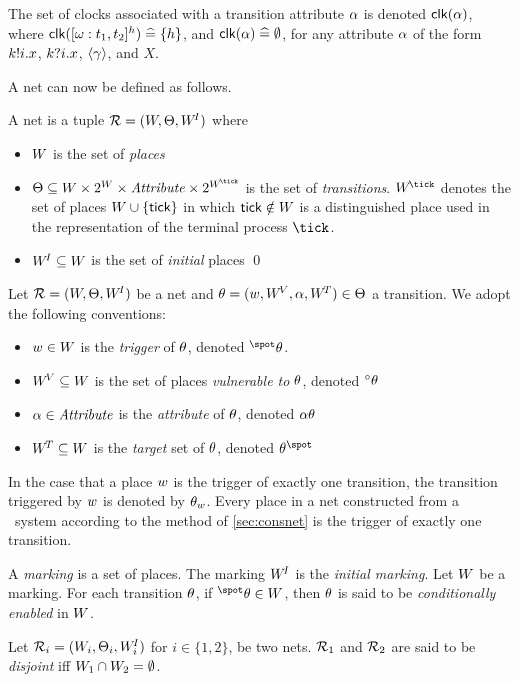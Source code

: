 The set of clocks associated with a transition attribute $\alpha$ is
denoted ${\mathop{\sf clk}}(\alpha)$, where 
${\mathop{\sf clk}}([\omega:t_1,t_2]^h) \mathrel{\widehat=}  \{h\}$, and ${\mathop{\sf clk}}(\alpha) \mathrel{\widehat=}
\emptyset$, for any attribute $\alpha$ of the form ${k}!{i}.x$, 
${k}?{i}.x$, ${\langle \gamma\rangle}$, and $X$. 

A net can now be defined as follows.
\begin{definition}[Net]
A net is a tuple $\RR = (\W,\T,\WI)$ where
\begin{itemize}
\item $W$ is the set of \emph{places}
\item $\T \subseteq \W \cross 2^\W \cross \TAttrib \cross 2^\WTick$ is the set
  of \emph{transitions}. $\WTick$ denotes the set of places $W
  \cup \{{\sf tick}\}$ in which ${\sf tick} \notin W$ is a distinguished
  place used in the representation of the terminal process $\tick$.
\item $W^{\!I} \subseteq W$ is the set of \emph{initial} places 
\qed
\end{itemize}
\end{definition}
Let $\RR = (\W,\T,\WI)$ be a net and $\theta = ({w},W^{\!V},\alpha,W^{\!T}) \in \Theta$
a transition. We adopt the following conventions:
\begin{itemize}
\item ${w} \in W$ is the \emph{trigger} of $\theta$, denoted $\preset{\tr}$.
\item $W^{\!V} \subseteq W$ is the set of places \emph{vulnerable to} $\theta$,
  denoted ${{}^\circ \theta}$
\item $\alpha \in {\text{\it Attribute\/}}$ is the \emph{attribute} of $\theta$, denoted ${\alpha\theta}$
\item $W^{\!T} \subseteq W$ is the \emph{target} set of $\theta$, denoted 
  $\postset{\tr}$   
\end{itemize}  

In the case that a place ${w}$ is the trigger of exactly one
transition, the transition triggered by ${w}$ is
denoted by $\theta_{w}$. Every place in a net constructed from a
\bcandle\ system according to the method of \Sec\ref{sec:consnet} is the
trigger of exactly one transition.

A \emph{marking} is a set of places. The marking $W^{\!I}$ is the
\emph{initial marking}. Let $W$ be a marking. For each transition
$\theta$, if $\preset{\tr} \in \W$, then $\theta$ is said to be
\emph{conditionally enabled} in $W$.
  
Let $\RR_i = (\W_i,\T_i,\WI_i)$ for $i \in \{1,2\}$, be two nets. $\RR_1$ and
$\RR_2$ are said to be \emph{disjoint} iff 
$W_1 \cap W_2 = \emptyset$.
 

